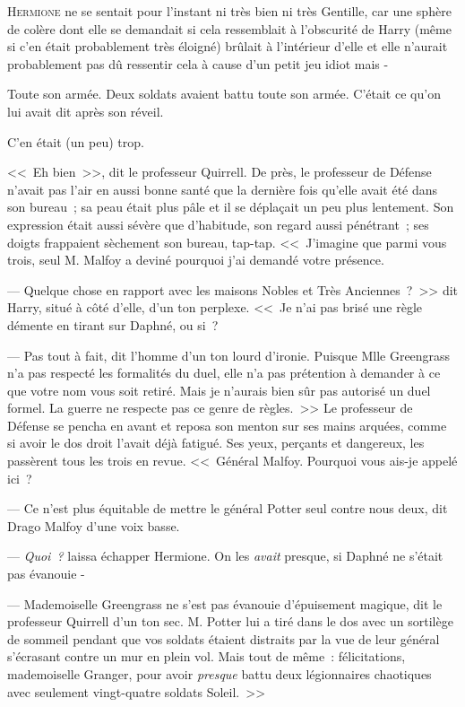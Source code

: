 
\lettrine{H}{ermione} ne se sentait pour l'instant ni très bien ni très Gentille, car une sphère de colère dont elle se demandait si cela ressemblait à l'obscurité de Harry (même si c'en était probablement très éloigné) brûlait à l'intérieur d'elle et elle n'aurait probablement pas dû ressentir cela à cause d'un petit jeu idiot mais -

Toute son armée. Deux soldats avaient battu toute son armée. C'était ce qu'on lui avait dit après son réveil.

C'en était (un peu) trop.

<<~Eh bien~>>, dit le professeur Quirrell. De près, le professeur de Défense n'avait pas l'air en aussi bonne santé que la dernière fois qu'elle avait été dans son bureau~; sa peau était plus pâle et il se déplaçait un peu plus lentement. Son expression était aussi sévère que d'habitude, son regard aussi pénétrant~; ses doigts frappaient sèchement son bureau, tap-tap. <<~J'imagine que parmi vous trois, seul M. Malfoy a deviné pourquoi j'ai demandé votre présence.

--- Quelque chose en rapport avec les maisons Nobles et Très Anciennes~?~>> dit Harry, situé à côté d'elle, d'un ton perplexe. <<~Je n'ai pas brisé une règle démente en tirant sur Daphné, ou si~?

--- Pas tout à fait, dit l'homme d'un ton lourd d'ironie. Puisque Mlle Greengrass n'a pas respecté les formalités du duel, elle n'a pas prétention à demander à ce que votre nom vous soit retiré. Mais je n'aurais bien sûr pas autorisé un duel formel. La guerre ne respecte pas ce genre de règles.~>> Le professeur de Défense se pencha en avant et reposa son menton sur ses mains arquées, comme si avoir le dos droit l'avait déjà fatigué. Ses yeux, perçants et dangereux, les passèrent tous les trois en revue. <<~Général Malfoy. Pourquoi vous ais-je appelé ici~?

--- Ce n'est plus équitable de mettre le général Potter seul contre nous deux, dit Drago Malfoy d'une voix basse.

--- \emph{Quoi~?} laissa échapper Hermione. On les \emph{avait} presque, si Daphné ne s'était pas évanouie -

--- Mademoiselle Greengrass ne s'est pas évanouie d'épuisement magique, dit le professeur Quirrell d'un ton sec. M. Potter lui a tiré dans le dos avec un sortilège de sommeil pendant que vos soldats étaient distraits par la vue de leur général s'écrasant contre un mur en plein vol. Mais tout de même~: félicitations, mademoiselle Granger, pour avoir \emph{presque} battu deux légionnaires chaotiques avec seulement vingt-quatre soldats Soleil.~>>

